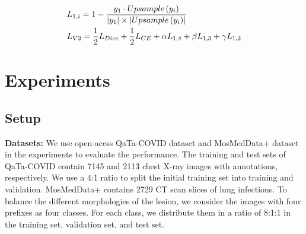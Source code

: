\documentclass{article}
\begin{document}
\vspace{-2mm}
\begin{eqnarray}
\setlength{\abovedisplayskip}{0pt}
\setlength{\belowdisplayskip}{0pt}
& L_{1,i}=1-\frac{y_{1}\cdot Upsample\left ( y_{i}\right ) }{\left | y_{1}\right |\times\left | Upsample\left ( y_{i}\right )\right | }\label{3.3-14}\\
& L_{V2}=\frac{1}{2}L_{Dice}+\frac{1}{2}L_{CE}+\alpha L_{1,4}+\beta L_{1,3}+\gamma L_{1,2}\label{3.3-15}
\end{eqnarray}


\vspace{-3mm}
\section{Experiments}
\label{sec:experiments}
\vspace{-3mm}
\subsection{Setup}
\vspace{-2mm}
\noindent\textbf{Datasets:} We use open-acess QaTa-COVID dataset \cite{yamac2021convolutional} and MosMedData+ dataset \cite{morozov2020mosmeddata,COVID-19-CT} in the experiments to evaluate the performance. The training and test sets of QaTa-COVID contain 7145 and 2113 chest X-ray images with annotations, respectively. We use a 4:1 ratio to split the initial training set into training and validation. MosMedData+ contains 2729 CT scan slices of lung infections. To balance the different morphologies of the lesion, we consider the images with four prefixes as four classes. For each class, we distribute them in a ratio of 8:1:1 in the training set, validation set, and test set.
\end{document}
